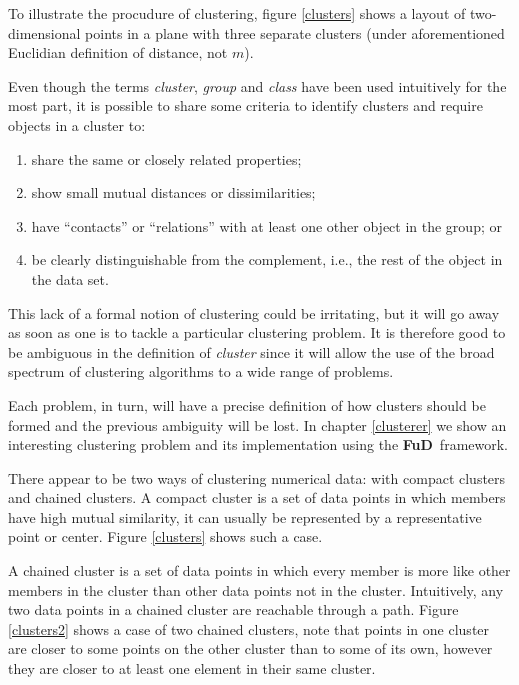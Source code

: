 \documentclass[a4paper,12pt,english]{report}
\newcommand{\fud}{\textbf{FuD}}
\begin{document}
To illustrate the procudure of clustering, figure \ref{clusters}  shows a layout of two-dimensional points in a plane with three separate clusters (under aforementioned Euclidian definition of distance, not $m$).

Even though the terms \emph{cluster}, \emph{group} and \emph{class} have been used intuitively for the most part, it is possible to share some criteria to identify clusters and require objects in a cluster to:

\begin{enumerate}
\item share the same or closely related properties;
\item show small mutual distances or dissimilarities;
\item have ``contacts'' or ``relations'' with at least one other object in the group; or
\item be clearly distinguishable from the complement, i.e., the rest of the object in the data set.
\end{enumerate}

This lack of a formal notion of clustering could be irritating, but it will go away as soon as one is to tackle a particular clustering problem. It is therefore good to be ambiguous in the definition of \emph{cluster} since it will allow the use of the broad spectrum of clustering algorithms to a wide range of problems.

Each problem, in turn, will have a precise definition of how clusters should be formed and the previous ambiguity will be lost. In chapter \ref{clusterer} we show an interesting clustering problem and its implementation using the \fud \ framework.

There appear to be two ways of clustering numerical data: with compact clusters and chained clusters. A compact cluster is a set of data points in which members have high mutual similarity, it can usually be represented by a representative point or center. Figure \ref{clusters} shows such a case.

A chained cluster is a set of data points in which every member is more like other members in the cluster than other data points not in the cluster. Intuitively, any two data points in a chained cluster are reachable through a path. Figure \ref{clusters2} shows a case of two chained clusters, note that points in one cluster are closer to some points on the other cluster than to some of its own, however they are closer to at least one element in their same cluster.
\end{document}
